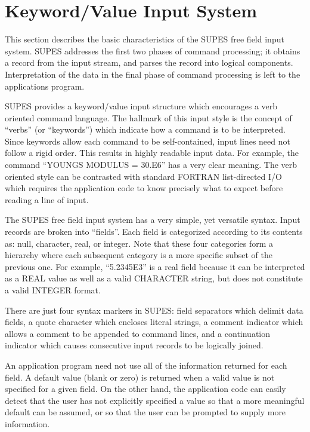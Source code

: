 \section{Keyword/Value Input System}
This section describes the basic characteristics of the SUPES free field
input system.  SUPES addresses the first two phases of command processing;
it obtains a record from the input stream, and parses the record into
logical components.  Interpretation of the data in the final phase of
command processing is left to the applications program.

SUPES provides a keyword/value input structure which encourages a verb
oriented command language.  The hallmark of this input style is the concept
of ``verbs'' (or ``keywords'') which indicate how a command is to be
interpreted.  Since keywords allow each command to be self-contained, input
lines need not follow a rigid order.  This results in highly readable input
data.  For example, the command ``YOUNGS MODULUS = 30.E6'' has a very clear
meaning.  The verb oriented style can be contrasted with standard FORTRAN
list-directed I/O which requires the application code to know precisely what
to expect before reading a line of input.

The SUPES free field input system has a very simple, yet versatile syntax.
Input records are broken into ``fields''.  Each field is categorized
according to its contents as: null, character, real, or integer.  Note that
these four categories form a hierarchy where each subsequent category is a
more specific subset of the previous one.  For example, ``5.2345E3'' is a
real field because it can be interpreted as a REAL value as well as a valid
CHARACTER string, but does not constitute a valid INTEGER format.

There are just four syntax markers in SUPES: field separators which delimit
data fields, a quote character which encloses literal strings, a comment
indicator which allows a comment to be appended to command lines, and a
continuation indicator which causes consecutive input records to be
logically joined.

An application program need not use all of the information returned for
each field.  A default value (blank or zero) is returned when a valid value
is not specified for a given field.  On the other hand, the application code
can easily detect that the user has not explicitly specified a value so that
a more meaningful default can be assumed, or so that the user can be
prompted to supply more information.


